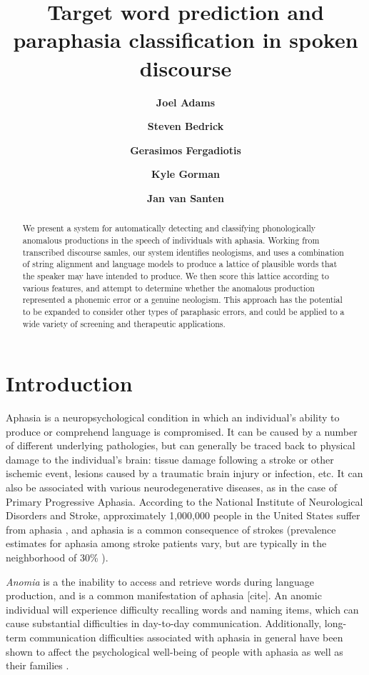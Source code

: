 \documentclass[11pt,letterpaper]{article}
\title{Target word prediction and paraphasia classification in spoken discourse}
\author[1]{\textbf{Joel Adams}}
\author[1]{\textbf{Steven Bedrick}}
\author[2]{\textbf{Gerasimos Fergadiotis}}
\author[3]{\textbf{Kyle Gorman}}
\author[1]{\textbf{Jan van Santen}}
\affil[1]{Center for Spoken Language Understanding, Oregon Health \& Science University, Portland, OR}
\affil[2]{Speech \& Hearing Sciences Department, Portland State University, Portland, OR}
\affil[3]{Google, Inc., New York, NY}
\date{}
\begin{document}
\maketitle

\begin{abstract}

We present a system for automatically detecting and classifying phonologically anomalous productions in the speech of individuals with aphasia.
Working from transcribed discourse samles, our system identifies neologisms, and uses a combination of string alignment and language models to produce a lattice of plausible words that the speaker may have intended to produce.
We then score this lattice according to various features, and attempt to determine whether the anomalous production represented a phonemic error or a genuine neologism.
This approach has the potential to be expanded to consider other types of paraphasic errors, and could be applied to a wide variety of screening and therapeutic applications.

\end{abstract}

\section{Introduction}

Aphasia is a neuropsychological condition in which an individual's ability to produce or comprehend language is compromised.
It can be caused by a number of different underlying pathologies, but can generally be traced back to physical damage to the individual's brain: tissue damage following a stroke or other ischemic event, lesions caused by a traumatic brain injury or infection, etc.
It can also be associated with various neurodegenerative diseases, as in the case of Primary Progressive Aphasia.
According to the National Institute of Neurological Disorders and Stroke, approximately 1,000,000 people in the United States suffer from aphasia \cite{National-Institute-of-Neurological-Disorders-and-Stroke:2014la}, and aphasia is a common consequence of strokes (prevalence estimates for aphasia among stroke patients vary, but are typically in the neighborhood of 30\% \cite{Engelter:2006da}).

\emph{Anomia} is a the inability to access and retrieve words during language production, and is a common manifestation of aphasia [cite].
An anomic individual will experience difficulty recalling words and naming items, which can cause substantial difficulties in day-to-day communication.
Additionally, long-term communication difficulties associated with aphasia in general have been shown to affect the psychological well-being of people with aphasia as well as their families \cite{doi:10.1080/02687030244000707,Gaete:2008jr,vanDijk:2015gz}.
\end{document}
